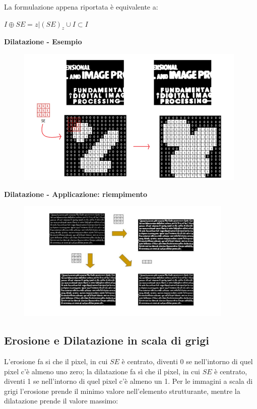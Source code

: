 La formulazione appena riportata è equivalente a:

\begin{center}
    $I \oplus SE = {z|(SE)_z \cup I} \subset I$
\end{center}
\textbf{Dilatazione - Esempio}

\begin{figure}[H]
    \centering
    \includegraphics[width=\linewidth, keepaspectratio]{capitoli/immagini/imgs/dilatazione-esempio.png}
\end{figure}

\textbf{Dilatazione - Applicazione: riempimento}
\begin{figure}[H]
    \centering
    \includegraphics[width=\linewidth, keepaspectratio]{capitoli/immagini/imgs/dilatazione-applicazione.png}
\end{figure}

\subsection{Erosione e Dilatazione in scala di grigi}
L'erosione fa si che il pixel, in cui $SE$ è centrato, diventi 0 se nell'intorno di quel pixel c'è almeno uno zero; la dilatazione fa sì
che il pixel, in cui $SE$ è centrato, diventi 1 se nell'intorno di quel pixel c'è almeno un 1.
Per le immagini a scala di grigi l'erosione prende il minimo valore nell'elemento strutturante, mentre la dilatazione prende il valore massimo:


